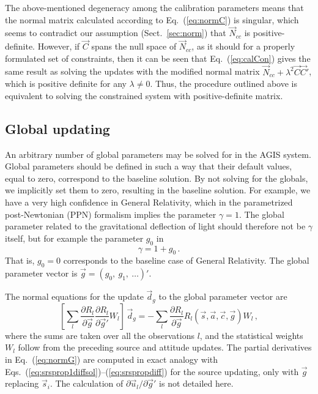 \documentclass[structabstract]{aa}
\begin{document}
The above-mentioned degeneracy among the calibration parameters
means that the normal matrix calculated according to Eq.~(\ref{eq:normC})
is singular, which seems to contradict our assumption (Sect.~\ref{sec:norm})
that $\vec{N}_{cc}$ is positive-definite. However, if $\vec{C}$ spans
the null space of $\vec{N}_{cc}$, as it should for a properly formulated set
of constraints, then it can be seen that Eq.~(\ref{eq:calCon}) gives the same 
result as solving the updates with the modified normal matrix 
$\vec{N}_{cc}+\lambda^2\vec{C}\vec{C}'$, which is positive definite for
any $\lambda\ne 0$. Thus, the procedure outlined above is equivalent to
solving the constrained system with positive-definite matrix.


\subsection{Global updating} \label{sec:globalupdate}

An arbitrary number of global parameters may be solved for in the AGIS system.
Global parameters should be defined in such a way that their default values, 
equal to zero, correspond to the baseline solution. By not solving for the
globals, we implicitly set them to zero, resulting in the baseline solution. For example,
we have a very high confidence in General Relativity, which in the parametrized
post-Newtonian (PPN) formalism implies the parameter $\gamma=1$. 
The global parameter related to the gravitational deflection of light should 
therefore not be $\gamma$ itself, but for example the parameter $g_0$ in
\begin{equation}\label{eq:gammaPPN}
\gamma = 1 + g_0 \, .
\end{equation}
That is, $g_0=0$ corresponds to the baseline case of General Relativity.
The global parameter vector is $\vec{g}=(g_0,~g_1,~\dots)'$.

The normal equations for the update $\vec{d}_g$ to the global parameter
vector are
\begin{equation} \label{eq:normG}
\left[ \sum_l \frac{\partial R_l}{\partial\vec{g}}
\frac{\partial R_l}{\partial\vec{g}'} W_l \right]\,\vec{d}_g
= -\sum_l \frac{\partial R_l}{\partial\vec{g}}
R_l(\vec{s},\vec{a},\vec{c},\vec{g})W_l \, ,
\end{equation}
where the sums are taken over all the observations $l$, and the statistical
weights $W_l$ follow from the preceding source and attitude updates.
The partial derivatives in Eq.~(\ref{eq:normG}) are computed in exact
analogy with Eqs.~(\ref{eq:srsprop1diffsol})--(\ref{eq:srspropdiff}) for
the source updating, only with $\vec{g}$ replacing $\vec{s}_i$. The
calculation of $\partial\vec{u}_l/\partial\vec{g}'$ is not detailed here.
\end{document}
